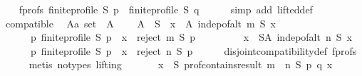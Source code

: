 \begin{isabellebody}
\ \ \isamarkupfalse%
\ f{\isacharunderscore}{\kern0pt}profs{\isacharcolon}{\kern0pt}\ {\isachardoublequoteopen}finite{\isacharunderscore}{\kern0pt}profile\ S\ p\ {\isasymand}\ finite{\isacharunderscore}{\kern0pt}profile\ S\ q{\isachardoublequoteclose}\isanewline
\ \ \ \ \isamarkupfalse%
\ {\isacharparenleft}{\kern0pt}simp\ add{\isacharcolon}{\kern0pt}\ lifted{\isacharunderscore}{\kern0pt}def{\isacharparenright}{\kern0pt}\isanewline
\ \ \isamarkupfalse%
\ compatible\ \isamarkupfalse%
\ A{\isacharcolon}{\kern0pt}{\isacharcolon}{\kern0pt}{\isachardoublequoteopen}{\isacharprime}{\kern0pt}a\ set{\isachardoublequoteclose}\ \ A{\isacharcolon}{\kern0pt}\isanewline
\ \ \ \ {\isachardoublequoteopen}A\ {\isasymsubseteq}\ S\ {\isasymand}\ {\isacharparenleft}{\kern0pt}{\isasymforall}x\ {\isasymin}\ A{\isachardot}{\kern0pt}\ indep{\isacharunderscore}{\kern0pt}of{\isacharunderscore}{\kern0pt}alt\ m\ S\ x\ {\isasymand}\isanewline
\ \ \ \ \ \ {\isacharparenleft}{\kern0pt}{\isasymforall}p{\isachardot}{\kern0pt}\ finite{\isacharunderscore}{\kern0pt}profile\ S\ p\ {\isasymlongrightarrow}\ x\ {\isasymin}\ reject\ m\ S\ p{\isacharparenright}{\kern0pt}{\isacharparenright}{\kern0pt}\ {\isasymand}\isanewline
\ \ \ \ \ \ \ \ {\isacharparenleft}{\kern0pt}{\isasymforall}x\ {\isasymin}\ S{\isacharminus}{\kern0pt}A{\isachardot}{\kern0pt}\ indep{\isacharunderscore}{\kern0pt}of{\isacharunderscore}{\kern0pt}alt\ n\ S\ x\ {\isasymand}\isanewline
\ \ \ \ \ \ {\isacharparenleft}{\kern0pt}{\isasymforall}p{\isachardot}{\kern0pt}\ finite{\isacharunderscore}{\kern0pt}profile\ S\ p\ {\isasymlongrightarrow}\ x\ {\isasymin}\ reject\ n\ S\ p{\isacharparenright}{\kern0pt}{\isacharparenright}{\kern0pt}{\isachardoublequoteclose}\isanewline
\ \ \ \ \isamarkupfalse%
\ disjoint{\isacharunderscore}{\kern0pt}compatibility{\isacharunderscore}{\kern0pt}def\ f{\isacharunderscore}{\kern0pt}profs\isanewline
\ \ \ \ \isamarkupfalse%
\ {\isacharparenleft}{\kern0pt}metis\ {\isacharparenleft}{\kern0pt}no{\isacharunderscore}{\kern0pt}types{\isacharcomma}{\kern0pt}\ lifting{\isacharparenright}{\kern0pt}{\isacharparenright}{\kern0pt}\isanewline
\ \ \isamarkupfalse%
\isanewline
\ \ \ \ {\isachardoublequoteopen}{\isasymforall}x\ {\isasymin}\ S{\isachardot}{\kern0pt}\ prof{\isacharunderscore}{\kern0pt}contains{\isacharunderscore}{\kern0pt}result\ {\isacharparenleft}{\kern0pt}m\ {\isasymparallel}\isactrlsub {\isasymup}\ n{\isacharparenright}{\kern0pt}\ S\ p\ q\ x{\isachardoublequoteclose}\isanewline

\end{isabellebody}
